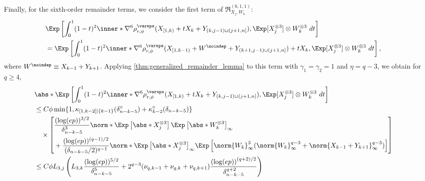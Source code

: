 \documentclass[aos]{imsart}
\begin{document}
\begin{appendix}
Finally, for the sixth-order remainder terms, we consider the first term of $\mathfrak{R}_{X_j, W_k}^{(6,1,1)}$:
\begin{equation*}
\begin{aligned}
    & \Exp\left[ 
        \int_0^1 (1-t)^2 \inner*{
            \nabla^6 \rho_{r,\phi}^\vareps(X_{[1,k)} + t X_k + Y_{(k,j-1) \cup (j+1,n]}) ,
            \Exp[X_j^{\otimes 3}] \otimes W_k^{\otimes 3}
        } ~dt
    \right] \\
    & = \Exp\left[ 
        \int_0^1 (1-t)^2 \inner*{
            \nabla^6 \rho_{r,\phi}^\vareps(X_{[1,k-1)} + W^\noindep + Y_{(k+1,j-1) \cup (j+1,n]}) + t X_k,
            \Exp[X_j^{\otimes 3}] \otimes W_k^{\otimes 3}
        } ~dt
    \right], \\
\end{aligned}
\end{equation*}
where $W^\noindep \equiv X_{k-1} + Y_{k+1}$. Applying \cref{thm:generalized_remainder_lemma} to this term with $\gamma_1 = \gamma_2 = 1$ and $\eta = q-3$, we obtain for $q \geq 4$,
\begin{equation*}
\begin{aligned}
    & \abs*{ \Exp\left[ 
        \int_0^1 (1-t)^2 \inner*{
            \nabla^6 \rho_{r,\phi}^\vareps(X_{[1,k)} + t X_k + Y_{(k,j-1) \cup (j+1,n]}) ,
            \Exp[X_j^{\otimes 3}] \otimes W_k^{\otimes 3}
        } ~dt
    \right] } \\
    & \leq C \phi 
        \min\{1, \kappa_{[1,k-2]|\{k-1\}}(\delta_{n-k-5}^\circ) + \kappa^\circ_{k-2}(\delta_{n-k-5})\} \\
    & \quad \times \left[ \begin{aligned}
        & \frac{(\log(ep))^{3/2}}{\delta_{n-k-5}^3} 
        \norm*{\Exp\left[
            \abs*{X_j^{\otimes 3}}
        \right]
        \Exp\left[
            \abs*{W_k^{\otimes 3}}
        \right]}_\infty \\
        & + \frac{(\log(ep))^{(q-1)/2}}{(\delta_{n-k-5}/2)^{q-1}} 
        \norm*{\Exp\left[
            \abs*{X_j^{\otimes 3}}
        \right]}_\infty
        \Exp\left[ 
             \norm{W_k}_\infty^3
            (\norm{W_k}_\infty^{q-3} + \norm{X_{k-1}+Y_{k+1}}_\infty^{q-3}) 
        \right]
    \end{aligned} \right] \\
    & \leq C \phi L_{3,j} \left( 
        L_{3,k} \frac{(\log(ep))^{5/2}}{\delta_{n-k-5}^5}
        + 2^{q-3} (\nu_{q,k-1} + \nu_{q,k} + \nu_{q,k+1}) \frac{{(\log(ep))}^{(q+2)/2}}{\delta_{n-k-5}^{q+2}}
    \right) \\

\end{aligned}
\end{equation*}
\end{appendix}
\end{document}
